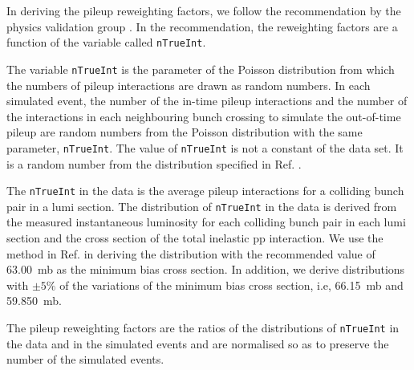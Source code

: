 In deriving the pileup reweighting factors, we follow the
recommendation by the physics validation group
\cite{twiki-PdmVPileUpDescription, twiki-PileupJSONFileforData}. In
the recommendation, the reweighting factors are a function of the
variable called \verb!nTrueInt!.

The variable \verb!nTrueInt! is the parameter of the Poisson
distribution from which the numbers of pileup interactions are drawn
as random numbers. In each simulated event, the number of the in-time
pileup interactions and the number of the interactions in each
neighbouring bunch crossing to simulate the out-of-time pileup are
random numbers from the Poisson distribution with the same parameter,
\verb!nTrueInt!. The value of \verb!nTrueInt! is not a constant of the
data set. It is a random number from the distribution specified in
Ref. \cite{github-mix_2016_25ns_SpringMC_PUScenarioV1_PoissonOOTPU_cfi}.

The \verb!nTrueInt! in the data is the average pileup interactions for
a colliding bunch pair in a lumi section. The distribution of
\verb!nTrueInt! in the data is derived from the measured instantaneous
luminosity for each colliding bunch pair in each lumi section and the
cross section of the total inelastic pp interaction. We use the method
in Ref. \cite{twiki-PileupJSONFileforData} in deriving the
distribution with the recommended value of 63.00~mb as the minimum
bias cross section. In addition, we derive distributions with $\pm
5\%$ of the variations of the minimum bias cross section, i.e,
66.15~mb and 59.850~mb.

The pileup reweighting factors are the ratios of the distributions of
\verb!nTrueInt! in the data and in the simulated events and are
normalised so as to preserve the number of the simulated events.

